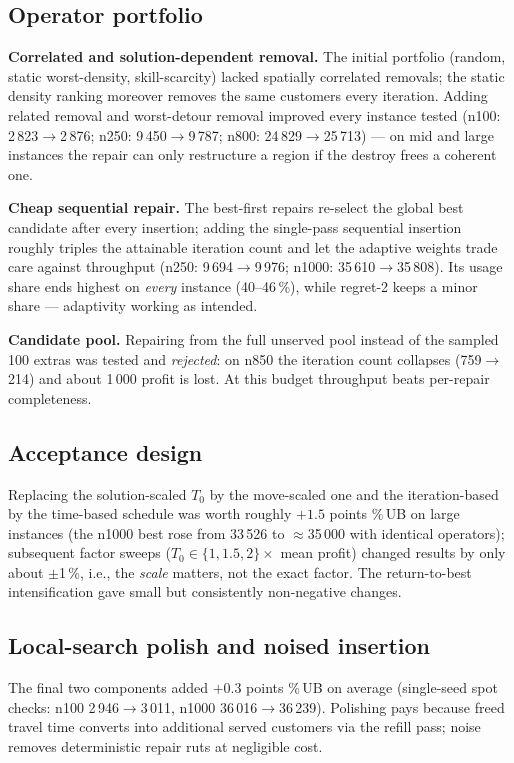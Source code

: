 \documentclass[10pt, a4paper]{article}
\newcommand{\ub}{\%\,UB}
\begin{document}
\subsection{Operator portfolio}
\textbf{Correlated and solution-dependent removal.} The initial portfolio
(random, static worst-density, skill-scarcity) lacked spatially correlated
removals; the static density ranking moreover removes the same customers
every iteration. Adding related removal and worst-detour removal improved
every instance tested (n100: 2\,823$\to$2\,876; n250: 9\,450$\to$9\,787;
n800: 24\,829$\to$25\,713) --- on mid and large instances the repair can only
restructure a region if the destroy frees a coherent one.

\textbf{Cheap sequential repair.} The best-first repairs re-select the global
best candidate after every insertion; adding the single-pass sequential
insertion roughly triples the attainable iteration count and let the adaptive
weights trade care against throughput (n250: 9\,694$\to$9\,976; n1000:
35\,610$\to$35\,808). Its usage share ends highest on \emph{every} instance
(40--46\,\%), while regret-2 keeps a minor share --- adaptivity working as
intended.

\textbf{Candidate pool.} Repairing from the full unserved pool instead of the
sampled 100 extras was tested and \emph{rejected}: on n850 the iteration
count collapses (759$\to$214) and about 1\,000 profit is lost. At this budget
throughput beats per-repair completeness.

\subsection{Acceptance design}
Replacing the solution-scaled $T_0$ by the move-scaled one and the
iteration-based by the time-based schedule was worth roughly $+1.5$ points
\ub{} on large instances (the n1000 best rose from 33\,526 to
$\approx$35\,000 with identical operators); subsequent factor sweeps
($T_0\in\{1,1.5,2\}\times$ mean profit) changed results by only about
$\pm$1\,\%, i.e., the \emph{scale} matters, not the exact factor. The
return-to-best intensification gave small but consistently non-negative
changes.

\subsection{Local-search polish and noised insertion}
The final two components added $+0.3$ points \ub{} on average (single-seed
spot checks: n100 2\,946$\to$3\,011, n1000 36\,016$\to$36\,239). Polishing
pays because freed travel time converts into additional served customers via
the refill pass; noise removes deterministic repair ruts at negligible cost.
\end{document}

